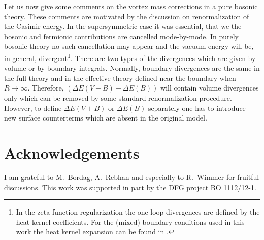\documentclass[a4paper,12pt]{article}
\begin{document}
Let us now give some comments on the vortex mass corrections in
a pure bosonic theory. These comments are motivated by the 
discussion \cite{discussion} on renormalization of the Casimir
energy. In the supersymmetric case  
it was essential, that we the bosonic and fermionic contributions
are cancelled mode-by-mode. In purely bosonic theory no such
cancellation may appear and the vacuum energy will be, in general,
divergent\footnote{In the zeta function regularization the one-loop
divergences are defined by the heat kernel coefficients. 
For the (mixed) boundary conditions used in this work the heat
kernel expansion can be found in \cite{Branson:1999jz}.}.
There are two types of the divergences which are given by volume
or by boundary integrals. Normally, boundary divergences are the
same in the full theory and in the effective theory defined near
the boundary when $R\to \infty$. Therefore, $(\Delta E(V+B) -
\Delta E(B))$ will contain volume divergences only which can
be removed by some standard renormalization procedure. However,
to define $\Delta E(V+B)$ or $\Delta E(B)$ separately one has
to introduce new surface counterterms which are absent in the
original model.  
\section*{Acknowledgements}
I am grateful to M.~Bordag, A.~Rebhan and especially to R.~Wimmer
for fruitful discussions.
This work was supported in part by the DFG project BO 1112/12-1.
\appendix
\end{document}
